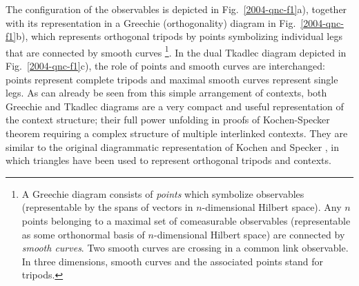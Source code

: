 \documentclass[pra,preprint,showpacs,showkeys,amsfonts]{revtex4}
\begin{document}
The configuration of the observables
is depicted in Fig.~\ref{2004-qnc-f1}a),
together with its representation in a Greechie (orthogonality) diagram
\cite{greechie:71} in Fig.~\ref{2004-qnc-f1}b),
which represents orthogonal tripods by points symbolizing
individual legs that are connected by smooth curves
\footnote{
A Greechie diagram consists of {\em points} which
symbolize observables (representable by the spans of vectors
in $n$-dimensional Hilbert space).
Any $n$ points belonging to a maximal set of comeasurable observables
(representable as some orthonormal basis of  $n$-dimensional Hilbert space)
are connected by {\em smooth curves}. Two smooth curves are crossing in a common link observable.
In three dimensions, smooth curves and the associated points stand for tripods.
}.
In the dual Tkadlec diagram \cite{tkadlec-00} depicted in Fig.~\ref{2004-qnc-f1}c),
the role of points and
smooth curves are interchanged: points represent complete tripods and maximal smooth curves represent
single legs.
As can already be seen from this simple arrangement of contexts,
both Greechie and Tkadlec diagrams are a very compact and useful
representation of the context structure;
their full power unfolding
in proofs of Kochen-Specker theorem \cite{svozil-tkadlec,tkadlec-96,tkadlec-00}
requiring a complex structure of multiple interlinked contexts.
They are similar to the original diagrammatic representation of Kochen and Specker \cite{kochen1},
in which triangles have been used to represent orthogonal tripods and contexts.
\end{document}
